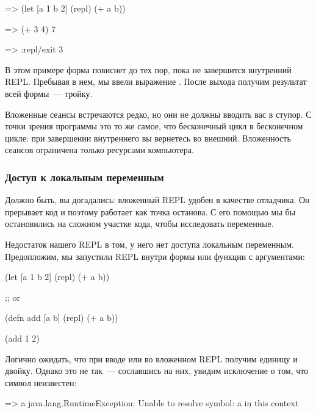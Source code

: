 \begin{english}
  \begin{clojure}
=> (let [a 1 b 2] (repl) (+ a b))

=> (+ 3 4)
7

=> :repl/exit
3
  \end{clojure}
\end{english}

В этом примере форма  повиснет до тех пор, пока не завершится внутренний REPL. Пребывая в нем, мы ввели выражение . После выхода получим результат всей формы~--- тройку.

Вложенные сеансы встречаются редко, но они не должны вводить вас в ступор. С точки зрения программы это то же самое, что бесконечный цикл в бесконечном цикле: при завершении внутреннего вы вернетесь во внешний. Вложенность сеансов ограничена только ресурсами компьютера.

\subsubsection{Доступ к локальным переменным}

Должно быть, вы догадались: вложенный REPL удобен в качестве отладчика. Он прерывает код и поэтому работает как точка останова. С его помощью мы бы остановились на сложном участке кода, чтобы исследовать переменные.

Недостаток нашего REPL в том, у него нет доступа локальным переменным. Предопложим, мы запустили REPL внутри формы  или функции с аргументами:

\begin{english}
  \begin{clojure}
(let [a 1 b 2]
  (repl)
  (+ a b))

;; or

(defn add [a b]
  (repl)
  (+ a b))

(add 1 2)
  \end{clojure}
\end{english}

Логично ожидать, что при вводе  или  во вложенном REPL получим единицу и двойку. Однако это не так~--- сославшись на них, увидим исключение о том, что символ неизвестен:

\begin{english}
  \begin{clojure}
=> a
java.lang.RuntimeException: Unable to resolve symbol: a in this context
  \end{clojure}
\end{english}

